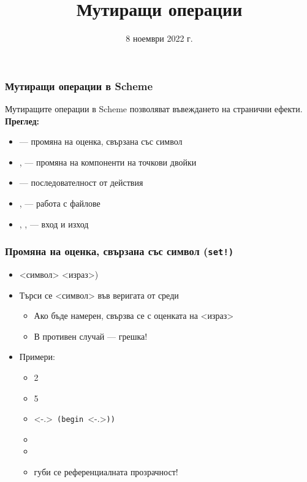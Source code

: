 \documentclass[alsotrans]{beamerswitch}
\title{Мутиращи операции}
\date{8 ноември 2022 г.}
\begin{document}
\begin{frame}
  \titlepage
\end{frame}

\begin{frame}
  \frametitle{Мутиращи операции в Scheme}

  Мутиращите операции в Scheme позволяват въвеждането на \alert{странични ефекти}.\\[4ex]
  \pause
  \textbf{Преглед:}
  \begin{itemize}[<+->]
  \item {} --- промяна на оценка, свързана със символ
  \item {},  --- промяна на компоненти на точкови двойки
  \item {} --- последователност от действия
  \item {},  --- работа с файлове
  \item {}, ,  --- вход и изход
  \end{itemize}
\end{frame}

\begin{frame}[fragile]
  \frametitle{Промяна на оценка, свързана със символ (\tt{set!})}

  \begin{itemize}[<+->]
  \item {} <символ> <израз>\tta)
  \item Търси се <символ> във веригата от среди
    \begin{itemize}
    \item Ако бъде намерен, свързва се с оценката на <израз>
    \item В противен случай --- \alert{грешка!}
    \end{itemize}
  \item Примери:
    \begin{itemize}
    \item {}\hspace{3em}2
    \item {}\hspace{4em}5
    \item {}\only<-.>{\tt{ (begin }}\only<-.>{\tt)}\tt)\pause
    \item {}
    \item {}
    \item \alert{губи се референциалната прозрачност!}
    \end{itemize}
  \end{itemize}
\end{frame}
\end{document}

